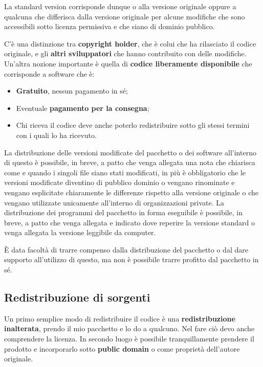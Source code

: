 La standard version corrisponde dunque o alla versione originale oppure a qualcuna che differisca dalla versione originale per alcune modifiche che sono accessibili sotto licenza permissiva e che siano di dominio pubblico.

C'è una distinzione tra \textbf{copyright holder}, che è colui che ha rilasciato il codice originale, e gli \textbf{altri sviluppatori} che hanno contribuito con delle modifiche. Un'altra nozione importante è quella di \textbf{codice liberamente disponibile} che corrisponde a software che è:

\begin{itemize}

\item \textbf{Gratuito}, nessun pagamento in sé;
\item Eventuale \textbf{pagamento per la consegna};
\item Chi riceva il codice deve anche poterlo redistribuire sotto gli stessi termini con i quali lo ha ricevuto. 

\end{itemize}

La distribuzione delle versioni modificate del pacchetto o dei software all'interno di questo è possibile, in breve, a patto che venga allegata una nota che chiarisca come e quando i singoli file siano stati modificati, in più è obbligatorio che le versioni modificate diventino di pubblico dominio o vengano rinominate e vengano esplicitate chiaramente le differenze rispetto alla versione originale o che vengano utilizzate unicamente all'interno di organizzazioni private. La distribuzione dei programmi del pacchetto in forma eseguibile è possibile, in breve, a patto che venga allegata e indicato dove reperire la versione standard o venga allegata la versione leggibile da computer.

È data facoltà di trarre compenso dalla distribuzione del pacchetto o dal dare supporto all'utilizzo di questo, ma non è possibile trarre profitto dal pacchetto in sé.

\subsection{Redistribuzione di sorgenti}

Un primo semplice modo di redistribuire il codice è una \textbf{redistribuzione inalterata}, prendo il mio pacchetto e lo do a qualcuno. Nel fare ciò devo anche comprendere la licenza. In secondo luogo è possibile tranquillamente prendere il prodotto e incorporarlo sotto \textbf{public domain} o come proprietà dell'autore originale. 

